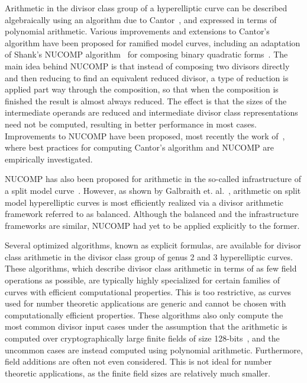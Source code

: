 Arithmetic in the divisor class group of a hyperelliptic curve can be described
algebraically using an algorithm due to Cantor~\cite{Cantor_compjac_1987}, and
expressed in terms of polynomial arithmetic. Various improvements and extensions
to Cantor's algorithm have been proposed for ramified model curves, including an
adaptation of Shank's NUCOMP algorithm~\cite{ShanksNUCOMP} for composing binary
quadratic forms~\cite{jacobson_nucomp_2002}. The main idea behind NUCOMP is that
instead of composing two divisors directly and then reducing to find an
equivalent reduced divisor, a type of reduction is applied part way through the
composition, so that when the composition is finished the result is almost
always reduced.  The effect is that the sizes of the intermediate operands are
reduced and intermediate divisor class representations need not be computed,
resulting in better performance in most cases. Improvements to NUCOMP have been
proposed, most recently the work of~\cite{ImbJac13:amc}, where best practices
for computing Cantor's algorithm and NUCOMP are empirically investigated. 

NUCOMP has also been proposed for arithmetic in the so-called infrastructure of
a split model curve~\cite{jacobson_fast_2007}. However, as shown by Galbraith
et. al.~\cite{Galbraith_balanced_2008,Morales_balanced_2009}, arithmetic on
split model hyperelliptic curves is most efficiently realized via a divisor
arithmetic framework referred to as balanced. Although the balanced and the
infrastructure frameworks are similar, NUCOMP had yet to be applied explicitly
to the former.

Several optimized algorithms, known as explicit formulas, are available for
divisor class arithmetic in the divisor class group of genus 2 and 3
hyperelliptic curves. These algorithms, which describe divisor class arithmetic
in terms of as few field operations as possible, are typically highly
specialized for certain families of curves with efficient computational
properties. This is too restrictive, as curves used for number theoretic
applications are generic and cannot be chosen with computationally efficient
properties. These algorithms also only compute the most common divisor input
cases under the assumption that the arithmetic is computed over
cryptographically large finite fields of size
128-bits~\cite{BosCostelloHisilLauter_fastg2_2013}, and the uncommon cases are
instead computed using polynomial arithmetic. Furthermore, field additions are
often not even considered. This is not ideal for number theoretic applications,
as the finite field sizes are relatively much smaller.



